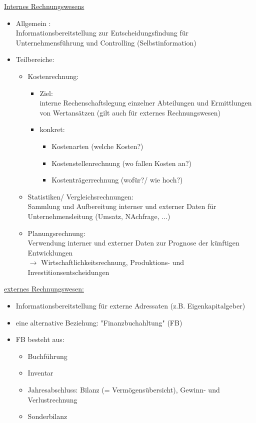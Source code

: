\documentclass[paper=a4, fontsize=11pt]{scrartcl}
\numberwithin{equation}{section}
\numberwithin{figure}{section}
\numberwithin{table}{section}
\begin{document}
\underline{Internes Rechnungswesens}
\begin{itemize}
  \item Allgemein :\\
  Informationsbereitstellung zur Entscheidungsfindung für Unternehmensführung und
  Controlling (Selbstinformation)
  \item Teilbereiche:
  \begin{itemize}
    \item Kostenrechnung:
    \begin{itemize}
      \item Ziel: \\
      interne Rechenschaftslegung einzelner Abteilungen und Ermittlungen von Wertansätzen
      (gilt auch für externes Rechnungswesen)
      \item konkret:
      \begin{itemize}
        \item Kostenarten (welche Kosten?)
        \item Kostenstellenrechnung (wo fallen Kosten an?)
        \item Kostenträgerrechnung (wofür?/ wie hoch?)
      \end{itemize}
    \end{itemize}
    \item Statistiken/ Vergleichsrechnungen: \\
    Sammlung und Aufbereitung interner und externer Daten für
    Unternehmensleitung (Umsatz, NAchfrage, ...)
    \item Planungsrechnung: \\
    Verwendung interner und externer Daten zur Prognose der künftigen Entwicklungen \\
    $\rightarrow$ Wirtschaftlichkeitsrechnung, Produktions- und Investitionsentscheidungen
  \end{itemize}
\end{itemize}

\underline{externes Rechnungswesen:}

\begin{itemize}
  \item Informationsbereitstellung für externe Adressaten (z.B. Eigenkapitalgeber)
  \item eine alternative Beziehung: "Finanzbuchahltung" (FB)
  \item FB besteht aus:
  \begin{itemize}
    \item Buchführung
    \item Inventar
    \item Jahresabschluss: Bilanz (= Vermögensübersicht), Gewinn- und Verlustrechnung
    \item Sonderbilanz
  \end{itemize}
\end{itemize}
\end{document}
